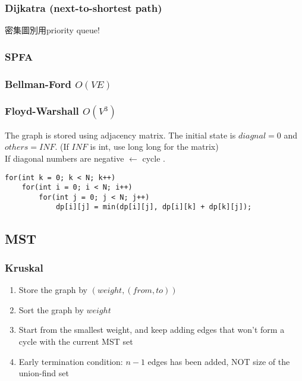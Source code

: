 \documentclass[10pt,oneside]{article}
\begin{document}
\begin{landscape}
\begin{multicols}{2}
%

\subsubsection{Dijkatra (next-to-shortest path)}
密集圖別用priority queue!


\subsubsection{SPFA}


\subsubsection{Bellman-Ford $O(VE)$}


\subsubsection{Floyd-Warshall $O(V^3)$}

The graph is stored using adjacency matrix. The initial state is $diagnal = 0$ and $others = INF$. (If $INF$ is int, use long long for the matrix)\\
If diagonal numbers are negative $\leftarrow$ cycle . \\

\begin{lstlisting}
for(int k = 0; k < N; k++)
	for(int i = 0; i < N; i++)
		for(int j = 0; j < N; j++)
			dp[i][j] = min(dp[i][j], dp[i][k] + dp[k][j]);
\end{lstlisting}

\subsection{MST}

\subsubsection{Kruskal}

\begin{enumerate}
	\item Store the graph by $(weight, (from , to))$
	\item Sort the graph by $weight$ 
	\item Start from the smallest weight, and keep adding edges that won't form a cycle with the current MST set
	\item Early termination condition: $n - 1$ edges has been added, NOT size of the union-find set
\end{enumerate}


\end{multicols}
\end{landscape}
\end{document}
